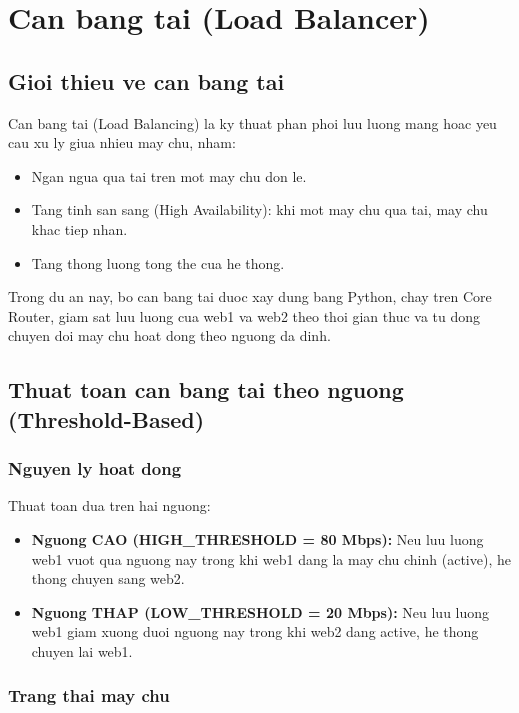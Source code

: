 \chapter{Can bang tai (Load Balancer)}

\section{Gioi thieu ve can bang tai}

Can bang tai (Load Balancing) la ky thuat phan phoi luu luong mang hoac yeu cau xu ly giua nhieu may chu, nham:
\begin{itemize}
    \item Ngan ngua qua tai tren mot may chu don le.
    \item Tang tinh san sang (High Availability): khi mot may chu qua tai, may chu khac tiep nhan.
    \item Tang thong luong tong the cua he thong.
\end{itemize}

Trong du an nay, bo can bang tai duoc xay dung bang Python, chay tren Core Router, giam sat luu luong cua web1 va web2 theo thoi gian thuc va tu dong chuyen doi may chu hoat dong theo nguong da dinh.

\section{Thuat toan can bang tai theo nguong (Threshold-Based)}

\subsection{Nguyen ly hoat dong}

Thuat toan dua tren hai nguong:
\begin{itemize}
    \item \textbf{Nguong CAO (HIGH\_THRESHOLD = 80 Mbps):} Neu luu luong web1 vuot qua nguong nay trong khi web1 dang la may chu chinh (active), he thong chuyen sang web2.
    \item \textbf{Nguong THAP (LOW\_THRESHOLD = 20 Mbps):} Neu luu luong web1 giam xuong duoi nguong nay trong khi web2 dang active, he thong chuyen lai web1.
\end{itemize}

\subsection{Trang thai may chu}

